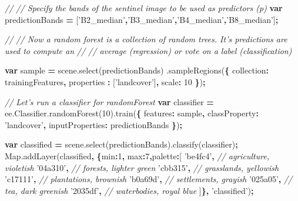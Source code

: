 \documentclass[]{article}
\newenvironment{Shaded}{\begin{snugshade}}{\end{snugshade}}
\newcommand{\AttributeTok}[1]{\textcolor[rgb]{0.77,0.63,0.00}{#1}}
\newcommand{\CommentTok}[1]{\textcolor[rgb]{0.56,0.35,0.01}{\textit{#1}}}
\newcommand{\DataTypeTok}[1]{\textcolor[rgb]{0.13,0.29,0.53}{#1}}
\newcommand{\DecValTok}[1]{\textcolor[rgb]{0.00,0.00,0.81}{#1}}
\newcommand{\KeywordTok}[1]{\textcolor[rgb]{0.13,0.29,0.53}{\textbf{#1}}}
\newcommand{\NormalTok}[1]{#1}
\newcommand{\OperatorTok}[1]{\textcolor[rgb]{0.81,0.36,0.00}{\textbf{#1}}}
\newcommand{\StringTok}[1]{\textcolor[rgb]{0.31,0.60,0.02}{#1}}
\newcommand{\VariableTok}[1]{\textcolor[rgb]{0.00,0.00,0.00}{#1}}
\begin{document}
\begin{Shaded}
\begin{Highlighting}[numbers=left,,]
\CommentTok{// // Specify the bands of the sentinel image to be used as predictors (p)}
\KeywordTok{var}\NormalTok{ predictionBands }\OperatorTok{=}\NormalTok{ [}\StringTok{'B2_median'}\OperatorTok{,}\StringTok{'B3_median'}\OperatorTok{,}\StringTok{'B4_median'}\OperatorTok{,}\StringTok{'B8_median'}\NormalTok{]}\OperatorTok{;}


\CommentTok{// // Now a random forest is a collection of random trees. It's predictions are used to compute an}
\CommentTok{// // average (regression) or vote on a label (classification)}

\KeywordTok{var}\NormalTok{ sample }\OperatorTok{=} \VariableTok{scene}\NormalTok{.}\AttributeTok{select}\NormalTok{(predictionBands)}
\NormalTok{                      .}\AttributeTok{sampleRegions}\NormalTok{(}\OperatorTok{\{}
                        \DataTypeTok{collection}\OperatorTok{:}\NormalTok{ trainingFeatures}\OperatorTok{,}
                        \DataTypeTok{properties }\OperatorTok{:}\NormalTok{ [}\StringTok{'landcover'}\NormalTok{]}\OperatorTok{,}
                        \DataTypeTok{scale}\OperatorTok{:} \DecValTok{10}
                              \OperatorTok{\}}\NormalTok{)}\OperatorTok{;}

\CommentTok{// Let's run a classifier for randomForest}
\KeywordTok{var}\NormalTok{ classifier }\OperatorTok{=} \VariableTok{ee}\NormalTok{.}\VariableTok{Classifier}\NormalTok{.}\AttributeTok{randomForest}\NormalTok{(}\DecValTok{10}\NormalTok{).}\AttributeTok{train}\NormalTok{(}\OperatorTok{\{}
                            \DataTypeTok{features}\OperatorTok{:}\NormalTok{ sample}\OperatorTok{,}
                            \DataTypeTok{classProperty}\OperatorTok{:} \StringTok{'landcover'}\OperatorTok{,}
                            \DataTypeTok{inputProperties}\OperatorTok{:}\NormalTok{ predictionBands}
\OperatorTok{\}}\NormalTok{)}\OperatorTok{;}


\KeywordTok{var}\NormalTok{ classified }\OperatorTok{=} \VariableTok{scene}\NormalTok{.}\AttributeTok{select}\NormalTok{(predictionBands).}\AttributeTok{classify}\NormalTok{(classifier)}\OperatorTok{;}
\VariableTok{Map}\NormalTok{.}\AttributeTok{addLayer}\NormalTok{(classified}\OperatorTok{,} \OperatorTok{\{}\DataTypeTok{min}\OperatorTok{:}\DecValTok{1}\OperatorTok{,} \DataTypeTok{max}\OperatorTok{:}\DecValTok{7}\OperatorTok{,}\DataTypeTok{palette}\OperatorTok{:}\NormalTok{[}
  \StringTok{'be4fc4'}\OperatorTok{,} \CommentTok{// agriculture, violetish}
  \StringTok{'04a310'}\OperatorTok{,} \CommentTok{// forests, lighter green}
  \StringTok{'cbb315'}\OperatorTok{,} \CommentTok{// grasslands, yellowish}
  \StringTok{'c17111'}\OperatorTok{,} \CommentTok{// plantations, brownish}
  \StringTok{'b0a69d'}\OperatorTok{,} \CommentTok{// settlements, grayish}
  \StringTok{'025a05'}\OperatorTok{,} \CommentTok{// tea, dark greenish}
  \StringTok{'2035df'}\OperatorTok{,} \CommentTok{// waterbodies, royal blue }
\NormalTok{  ]}\OperatorTok{\},} \StringTok{'classified'}\NormalTok{)}\OperatorTok{;}


\end{Highlighting}
\end{Shaded}
\end{document}
